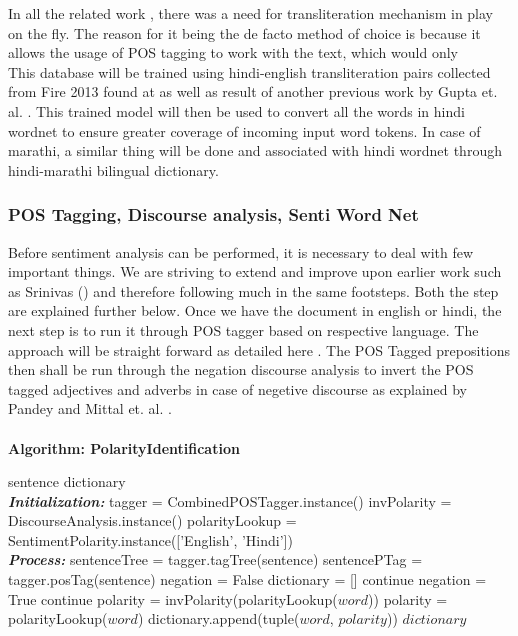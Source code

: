 \documentclass[conference]{IEEEtran}
\begin{document}
In all the related work \cite{shashank_sharma_sentiment_????}, there was a need
for transliteration mechanism in play on the fly. The reason for it being the
de facto method of choice is because it allows the usage of POS tagging to work
with the text, which would only \\
This database will be trained using hindi-english transliteration pairs
collected from Fire 2013 found at \cite{_linguistic_????} as well as result
of another previous work by Gupta et. al. \cite{gupta_mining_2012}. This
trained model will then be used to convert all the words in hindi wordnet to
ensure greater coverage of incoming input word tokens. In case of marathi, a
similar thing will be done and associated with hindi wordnet through
hindi-marathi bilingual dictionary.\\ 

\subsubsection{POS Tagging, Discourse analysis, Senti Word Net}
Before sentiment analysis can be performed, it is necessary to deal with few
important things. We are striving to extend and improve upon earlier work such
as Srinivas (\cite{sharma_text_2015}) and therefore following much in the same
footsteps. Both the step are explained further below.
Once we have the document in english or hindi, the next step is to run it
through POS tagger based on respective language. The approach will be straight
forward as detailed here \cite{vyas_pos_2014}. The POS Tagged prepositions
then shall be run through the negation discourse analysis to invert the POS
tagged adjectives and adverbs in case of negetive discourse as explained by Pandey
\cite{pandey_framework_2015} and Mittal et. al. \cite{mittal_sentiment_2013}.\\
\\
\hline
\textbf{ Algorithm: PolarityIdentification}
\hline
\begin{algorithmic}[1]
 \renewcommand{\algorithmicrequire}{\textbf{Input:}}
 \renewcommand{\algorithmicensure}{\textbf{Output:}}
 \REQUIRE sentence
 \ENSURE  dictionary
 \\ \textbf{\textit{Initialization:}}
 \STATE tagger = CombinedPOSTagger.instance()
 \STATE invPolarity = DiscourseAnalysis.instance()
 \STATE polarityLookup = SentimentPolarity.instance(['English', 'Hindi'])
 \\ \textbf{\textit{Process:}}
 sentenceTree = tagger.tagTree(sentence)
 sentencePTag = tagger.posTag(sentence)
 negation = False
 dictionary = []
    \STATE continue
  \ENDIF
    \STATE negation = True
    \STATE continue
  \ENDIF
    \STATE polarity = invPolarity(polarityLookup($word$))
  \ELSE
    \STATE polarity = polarityLookup($word$)
  \ENDIF
  dictionary.append(tuple($word$, $polarity$))
 \ENDFOR
 \RETURN $dictionary$
\end{algorithmic} 
\hline
\\
\end{document}
